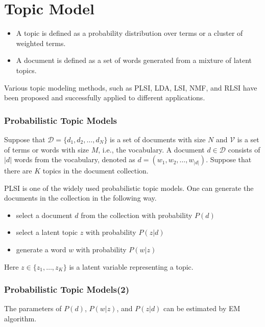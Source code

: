 \documentclass[slidestop,compress,mathserif]{beamer}
\begin{document}
	\section{Topic Model}
	\begin{frame}
		\begin{itemize}
			\frametitle{Topic Model}
			\item A topic is defined as a probability distribution over terms or a cluster of weighted terms.
			\item A document is defined as a set of words generated from a mixture of latent topics.
		\end{itemize}
		Various topic modeling methods, such as PLSI, LDA, LSI, NMF, and RLSI have been proposed and successfully applied to different applications.
	\end{frame}
	\begin{frame}
		\frametitle{Probabilistic Topic Models}
		Suppose that $\mathcal{D}=\{d_1,d_2,\ldots,d_N\}$ is a set of documents with size $N$ and $\mathcal{V}$ is a set of terms or words with size $M$, i.e., the vocabulary. A document $d\in\mathcal{D}$ consists of $|d|$ words from the vocabulary, denoted as $d=(w_1,w_2,\ldots,w_{|d|})$.
		Suppose that there are $K$ topics in the document collection.
		
		PLSI is one of the widely used probabilistic topic models. One can generate the documents in the collection in the following way.
		\begin{itemize}
			\item select a document $d$ from the collection with probability $P(d)$
			\item select a latent topic $z$ with probability $P(z|d)$
			\item generate a word $w$ with probability $P(w|z)$
		\end{itemize}
		Here $z\in \{z_1,\ldots,z_K\}$ is a latent variable representing a topic.
		
		
	\end{frame}	
	\begin{frame}
		\frametitle{Probabilistic Topic Models(2)}
		The parameters of $P(d)$, $P(w|z)$, and $P(z|d)$ can be estimated by EM algorithm.
		\begin{figure}
		\end{figure}
	\end{frame}
\end{document}
